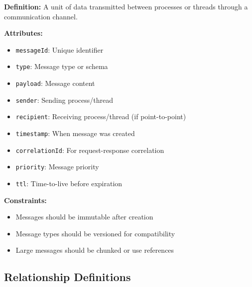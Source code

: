 \documentclass[11pt,letterpaper]{article}
\begin{document}
\begin{definitionbox}
\textbf{Definition:} A unit of data transmitted between processes or threads through a communication channel.

\textbf{Attributes:}
\begin{itemize}[nosep]
    \item \texttt{messageId}: Unique identifier
    \item \texttt{type}: Message type or schema
    \item \texttt{payload}: Message content
    \item \texttt{sender}: Sending process/thread
    \item \texttt{recipient}: Receiving process/thread (if point-to-point)
    \item \texttt{timestamp}: When message was created
    \item \texttt{correlationId}: For request-response correlation
    \item \texttt{priority}: Message priority
    \item \texttt{ttl}: Time-to-live before expiration
\end{itemize}

\textbf{Constraints:}
\begin{itemize}[nosep]
    \item Messages should be immutable after creation
    \item Message types should be versioned for compatibility
    \item Large messages should be chunked or use references
\end{itemize}
\end{definitionbox}

\subsection{Relationship Definitions}
\end{document}
